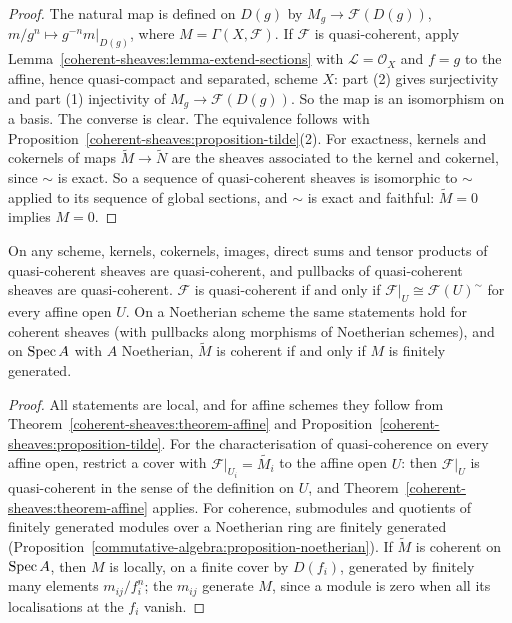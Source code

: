 \begin{proof}
The natural map is defined on $D(g)$ by $M_g \to \mathcal{F}(D(g))$, $m/g^n \mapsto g^{-n}m|_{D(g)}$, where $M = \Gamma(X, \mathcal{F})$. If $\mathcal{F}$ is
quasi-coherent, apply Lemma~\ref{coherent-sheaves:lemma-extend-sections} with $\mathcal{L} = \mathcal{O}_X$ and $f = g$ to the affine, hence quasi-compact
and separated, scheme $X$: part (2) gives surjectivity and part (1) injectivity of $M_g \to \mathcal{F}(D(g))$. So the map is an isomorphism on a basis.
The converse is clear. The equivalence follows with Proposition~\ref{coherent-sheaves:proposition-tilde}(2). For exactness, kernels and cokernels
of maps $\widetilde M \to \widetilde N$ are the sheaves associated to the kernel and cokernel, since $\sim$ is exact. So a sequence of quasi-coherent sheaves
is isomorphic to $\sim$ applied to its sequence of global sections, and $\sim$ is exact and faithful: $\widetilde M = 0$ implies $M = 0$.
\end{proof}

\begin{corollary}\label{coherent-sheaves:corollary-qc-properties}
On any scheme, kernels, cokernels, images, direct sums and tensor products of quasi-coherent sheaves are quasi-coherent, and pullbacks of
quasi-coherent sheaves are quasi-coherent. $\mathcal{F}$ is quasi-coherent if and only if $\mathcal{F}|_U \cong \mathcal{F}(U)^\sim$ for every affine open $U$.
On a Noetherian scheme the same statements hold for coherent sheaves (with pullbacks along morphisms of Noetherian schemes), and on
$\operatorname{Spec} A$ with $A$ Noetherian, $\widetilde M$ is coherent if and only if $M$ is finitely generated.
\end{corollary}

\begin{proof}
All statements are local, and for affine schemes they follow from Theorem~\ref{coherent-sheaves:theorem-affine} and
Proposition~\ref{coherent-sheaves:proposition-tilde}. For the characterisation of quasi-coherence on every affine open, restrict a cover with
$\mathcal{F}|_{U_i} = \widetilde{M_i}$ to the affine open $U$: then $\mathcal{F}|_U$ is quasi-coherent in the sense of the definition on $U$, and
Theorem~\ref{coherent-sheaves:theorem-affine} applies. For coherence, submodules and quotients of finitely generated modules over a Noetherian ring are
finitely generated (Proposition~\ref{commutative-algebra:proposition-noetherian}). If $\widetilde M$ is coherent on $\operatorname{Spec} A$, then $M$ is locally, on a
finite cover by $D(f_i)$, generated by finitely many elements $m_{ij}/f_i^{n}$; the $m_{ij}$ generate $M$, since a module is zero when all its
localisations at the $f_i$ vanish.
\end{proof}

